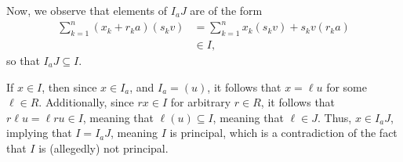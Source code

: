 \documentclass[10pt]{mypackage}
\begin{document}
\begin{solution}
  Now, we observe that elements of $I_aJ$ are of the form
  \begin{align*}
    \sum_{k=1}^{n} \left( x_k + r_ka \right)\left( s_k v \right) &= \sum_{k=1}^{n} x_k\left( s_k v \right) + s_kv\left( r_ka \right)\\
                                                                 &\in I,
  \end{align*}
  so that $I_aJ\subseteq I$.\newline

  If $x\in I$, then since $x\in I_a$, and $I_a = \left( u \right)$, it follows that $x = \ell u$ for some $\ell \in R$. Additionally, since $rx\in I$ for arbitrary $r\in R$, it follows that $ r\ell u = \ell ru \in I $, meaning that $ \ell \left( u \right) \subseteq I$, meaning that $\ell \in J$. Thus, $x\in I_aJ$, implying that $I = I_aJ$, meaning $I$ is principal, which is a contradiction of the fact that $I$ is (allegedly) not principal.
\end{solution}
\end{document}
